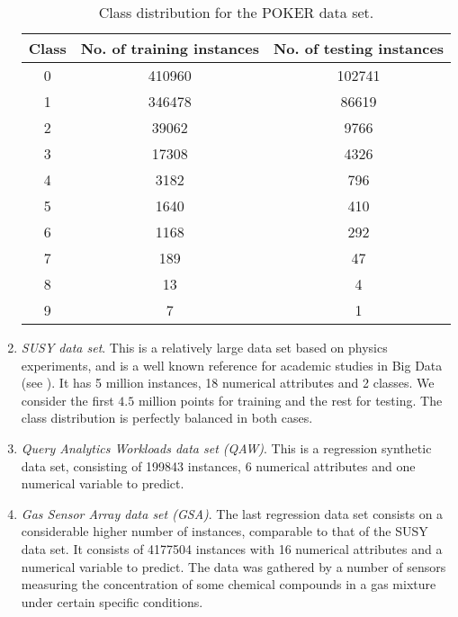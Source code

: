 \begin{enumerate}[1.]
    \begin{table}[h!]
  \centering
  \caption{Class distribution for the POKER data set.}
  \label{tab:poker-class}
  \begin{tabular}{ccc}
    \toprule
Class & No. of training instances & No. of testing instances \\ \midrule
0              & 410960                                & 102741                       \\
1              & 346478                                & 86619                        \\
2              & 39062                                 & 9766                         \\
3              & 17308                                 & 4326                         \\
4              & 3182                                  & 796                          \\
5              & 1640                                  & 410                          \\
6              & 1168                                  & 292                          \\
7              & 189                                   & 47                           \\
8              & 13                                    & 4                            \\
9              & 7                                     & 1\\
  \bottomrule
  \end{tabular}
  \end{table}

\item \textit{SUSY data set}. This is a relatively large data set based on physics experiments, and is a well known reference for academic studies in Big Data (see \cite {baldi2014searching}). It has 5 million instances, 18 numerical attributes and 2 classes. We consider the first $4.5$ million points for training and the rest for testing. The class distribution is perfectly balanced in both cases.

\item \textit{Query Analytics Workloads data set (QAW)}. This is a regression synthetic data set, consisting of 199843 instances, 6 numerical attributes and one numerical variable to predict.

\item \textit{Gas Sensor Array data set (GSA)}. The last regression data set consists on a considerable higher number of instances, comparable to that of the SUSY data set. It consists of 4177504 instances with 16 numerical attributes and a numerical variable to predict. The data was gathered by a number of sensors measuring the concentration of some chemical compounds in a gas mixture under certain specific conditions.
\end{enumerate}

